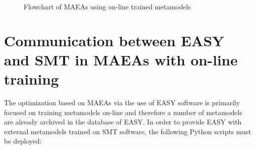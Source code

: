 \begin{figure}[h!]
\begin{center}
\begin{adjustbox}{width=1.0\textwidth,height= 
0.92\textheight,keepaspectratio}
\end{adjustbox}
\end{center}
\caption{Flowchart of MAEAs using on-line trained 
metamodels}
\label{fig:online_flowchart}
\end{figure}


\newpage

\section{Communication between EASY and SMT in MAEAs with on-line training}
The optimization based on MAEAs via the use of 
EASY\cite{EASY} software is primarily focused on training 
metamodels on-line and therefore a number of metamodels 
are already archived in the database of EASY. In order to
provide EASY with external metamodels trained on SMT 
software, the following Python scripts must be deployed:


